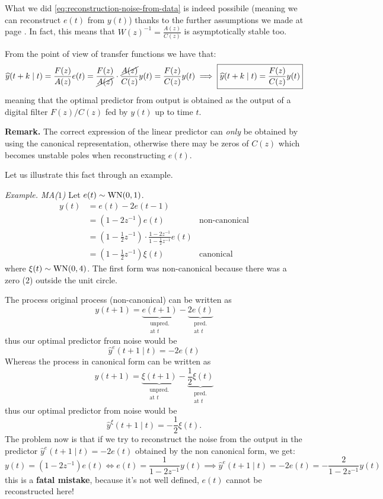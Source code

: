 
What we did \eqref{eq:reconstruction-noise-from-data} is indeed possibile (meaning we can reconstruct $e(t)$ from $y(t)$) thanks to the further assumptions we made at page \pageref{assumptions-prediction-theory}. In fact, this means that $W(z)^{-1}=\frac{A(z)}{C(z)}$ is asymptotically stable too.

From the point of view of transfer functions we have that:
\[
	\hat y (t+k\mid t) = \frac{F(z)}{A(z)}e(t) =\frac{F(z)}{\cancel{A(z)}}\cdot\frac{\cancel{A(z)}}{C(z)}y(t) =\frac{F(z)}{C(z)}y(t) \implies \boxed{\hat y (t+k\mid t) = \frac{F(z)}{C(z)}y(t)}
\]
meaning that the optimal predictor from output is obtained as the output of a digital filter $F(z)/C(z)$ fed by $y(t)$ up to time $t$.

\textbf{Remark.}
The correct expression of the linear predictor can \emph{only} be obtained by using the canonical representation, otherwise there may be zeros of $C(z)$ which becomes unstable poles when reconstructing $e(t)$.

Let us illustrate this fact through an example.

\emph{Example. MA($1$)}
Let $e(t)\sim \WN(0,1)$.
\begin{align*}
	y(t) &= e(t) - 2 e(t-1)\\
	&= (1-2z^{-1} )e(t) &\text{non-canonical}\\
	&=\left( 1-\frac{1}{2} z^{-1}  \right) \cdot\frac{1-2z^{-1}}{1-\frac{1}{2} z^{-1}} e(t)\\
	&=\left( 1-\frac{1}{2} z^{-1}  \right) \xi(t) &\text{canonical}
\end{align*}
where $\xi(t)\sim \WN(0,4)$. The first form was non-canonical because there was a zero ($2$) outside the unit circle.

The process original process (non-canonical) can be written as
\[
	y(t+1)=\underbrace{e(t+1)}_{\substack{\text{unpred.}\\\text{at $t$}}}-\underbrace{2e(t)}_{\substack{\text{pred.}\\\text{at $t$}}}
\]
thus our optimal predictor from noise would be
\[
	\hat y^{e} (t+1\mid t) = -2e(t)
\]
Whereas the process in canonical form can be written as 
\[
	y(t+1) =\underbrace{\xi(t+1)}_{\substack{\text{unpred.}\\\text{at $t$}}}-\underbrace{\frac{1}{2} \xi(t)}_{\substack{\text{pred.}\\\text{at $t$}}}
\]
thus our optimal predictor from noise would be
\[
	\hat y^{\xi} (t+1\mid t)=-\frac{1}{2} \xi(t).
\]
The problem now is that if we try to reconstruct the noise from the output in the predictor $\hat y^{e} (t+1\mid t) = -2e(t)$ obtained by the non canonical form, we get:
\[
	y(t)=(1-2z^{-1})e(t) \iff e(t) =\frac{1}{1-2z^{-1}} y(t) \implies \hat y^{e} (t+1\mid t) = -2e(t) = -\frac{2}{1-2z^{-1}}y(t)
\]
this is a \textbf{fatal mistake}, because it's not well defined, $e(t)$ cannot be reconstructed here!

